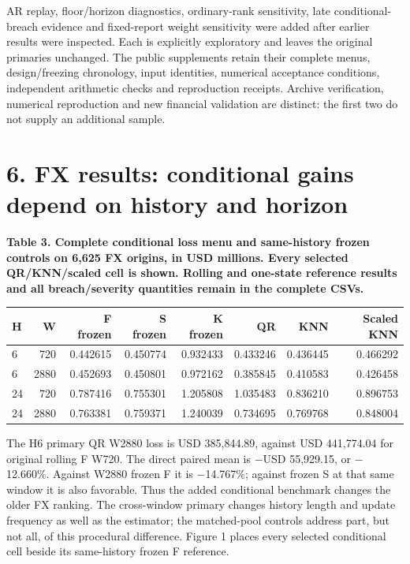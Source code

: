 \documentclass[10pt,a4paper]{article}
\begin{document}
AR replay, floor/horizon diagnostics, ordinary-rank sensitivity, late conditional-breach evidence and fixed-report weight sensitivity were added after earlier results were inspected. Each is explicitly exploratory and leaves the original primaries unchanged. The public supplements retain their complete menus, design/freezing chronology, input identities, numerical acceptance conditions, independent arithmetic checks and reproduction receipts. Archive verification, numerical reproduction and new financial validation are distinct: the first two do not supply an additional sample.

\section*{6. FX results: conditional gains depend on history and horizon}
\begin{center}
\begin{minipage}{\linewidth}
\small\textbf{Table 3. Complete conditional loss menu and same-history frozen controls on 6,625 FX origins, in USD millions. Every selected QR/KNN/scaled cell is shown. Rolling and one-state reference results and all breach/severity quantities remain in the complete CSVs.}\par\medskip
\centering\fontsize{8}{10}\selectfont
\begin{tabular}{lrrrrrrr}
\toprule
H & W & F frozen & S frozen & K frozen & QR & KNN & Scaled KNN \\
\midrule
6 & 720 & 0.442615 & 0.450774 & 0.932433 & 0.433246 & 0.436445 & 0.466292 \\
6 & 2880 & 0.452693 & 0.450801 & 0.972162 & 0.385845 & 0.410583 & 0.426458 \\
24 & 720 & 0.787416 & 0.755301 & 1.205808 & 1.035483 & 0.836210 & 0.896753 \\
24 & 2880 & 0.763381 & 0.759371 & 1.240039 & 0.734695 & 0.769768 & 0.848004 \\
\bottomrule
\end{tabular}
\end{minipage}
\end{center}
The H6 primary QR W2880 loss is USD 385,844.89, against USD 441,774.04 for original rolling F W720. The direct paired mean is \(-\)USD 55,929.15, or \(-\)12.660\%. Against W2880 frozen F it is \(-\)14.767\%; against frozen S at that same window it is also favorable. Thus the added conditional benchmark changes the older FX ranking. The cross-window primary changes history length and update frequency as well as the estimator; the matched-pool controls address part, but not all, of this procedural difference. Figure 1 places every selected conditional cell beside its same-history frozen F reference.
\end{document}
